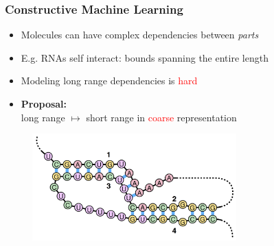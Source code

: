 \documentclass{beamer}
\newcommand{\red}[1]{\textcolor{red}{#1}}
\begin{document}
\begin{frame}
\frametitle{Constructive Machine Learning}

    \begin{itemize}
        \item Molecules can have complex dependencies between {\em parts}
        \item E.g. RNAs self interact: bounds spanning the entire length
        \item Modeling long range dependencies is \red{hard}
        \item {\bf Proposal:}\\ long range $\mapsto$ short range in \red{coarse} representation
    \end{itemize}
    \begin{figure}[ht]
        \centering
        \includegraphics[width=0.7\textwidth]{images/rna.png}
    \end{figure}    
\end{frame}
\end{document}
